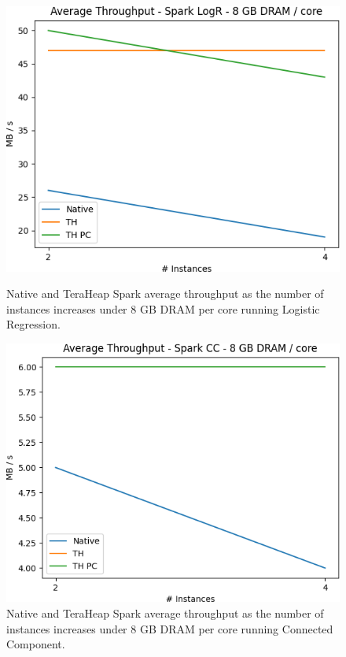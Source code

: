 \begin{figure}[thbp]
        \centering
        \includegraphics[width=\linewidth]{./fig/LOGR_64_THR.png}
    \caption{Native and TeraHeap Spark average throughput
        as the number of instances increases under 8 GB DRAM per core running Logistic Regression.}
                \label{fig:logr_64_thr}
        \includegraphics[width=\linewidth]{./fig/CC_64_THR.png}
    \caption{Native and TeraHeap Spark average throughput
        as the number of instances increases under 8 GB DRAM per core running Connected Component.}
                \label{fig:cc_64_thr}
\end{figure}
\iffalse
